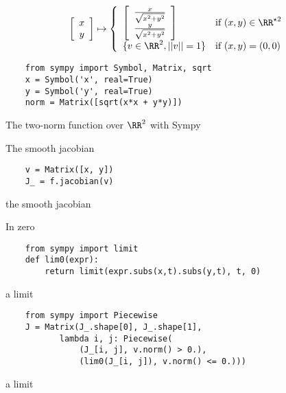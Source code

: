 \documentclass[a4paper]{article}
\begin{document}
\begin{equation}
  \begin{array}{ll}
    \left [
      \begin{array}{c}
        x\\
        y
      \end{array} \right]
    \mapsto \left\{
        \begin{array}{ll}
          \left[
            \begin{array}{c}
            \frac{x}{\sqrt{x^2+y^2}}\\
            \frac{y}{\sqrt{x^2+y^2}}
          \end{array} \right] & \mbox{if } (x, y) \in \RR^{\star 2} \\
        \{ v \in \RR^2, ||v|| = 1 \} & \mbox{if } (x, y) = (0, 0)
        
      \end{array}
    \right.
  \end{array}
\end{equation}

\begin{listing}[H] 
  \begin{verbatim}
    from sympy import Symbol, Matrix, sqrt
    x = Symbol('x', real=True)
    y = Symbol('y', real=True)
    norm = Matrix([sqrt(x*x + y*y)])
  \end{verbatim}
  \caption{The two-norm function over $\RR^2$ with Sympy}
\end{listing}


The smooth jacobian

\begin{listing}[H] 
  \begin{verbatim}
    v = Matrix([x, y])
    J_ = f.jacobian(v)
  \end{verbatim}
  \caption{the smooth jacobian}
\end{listing}

In zero
\begin{listing}[H] 
  \begin{verbatim}
    from sympy import limit
    def lim0(expr):
        return limit(expr.subs(x,t).subs(y,t), t, 0)
  \end{verbatim}
  \caption{a limit}
\end{listing}

\begin{listing}[H] 
  \begin{verbatim}
    from sympy import Piecewise
    J = Matrix(J_.shape[0], J_.shape[1], 
           lambda i, j: Piecewise(
               (J_[i, j], v.norm() > 0.),
               (lim0(J_[i, j]), v.norm() <= 0.)))
  \end{verbatim}
  \caption{a limit}
\end{listing}
\end{document}
